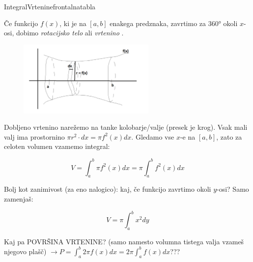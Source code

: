\begin{priprava}{}{}{Integral}{Vrtenine}{frontalna}{tabla}

Če funkcijo $ f(x) $, ki je na $ [a, b] $ enakega predznaka, zavrtimo za $ 360° $ okoli $ x $-osi, dobimo \emph{rotacijsko telo} ali \emph{vrtenino} .

\begin{figure}[h!]
    \centering
    \includegraphics[width=0.6\textwidth]{slike/volumen_vrtenine.png}
\end{figure}
    
Dobljeno vrtenino narežemo  na tanke kolobarje/valje (presek je krog). Vsak mali valj ima prostornino $ \pi r^2 \cdot dx = \pi f^2(x) dx $. Gledamo vse $ x $-e na $ [a, b] $, zato za celoten volumen vzamemo integral:

$$ V = \int_a^b \pi f^2(x) dx = \pi \int_a^b f^2(x) dx $$


Bolj kot zanimivost (za eno nalogico): kaj, če funkcijo zavrtimo okoli $ y $-osi? Samo zamenjaš:

$$ V = \pi \int_a^b x^2 dy $$

Kaj pa POVRŠINA VRTENINE? (samo namesto volumna tistega valja vzameš njegovo plašč) $ \rightarrow P = \int_a^b 2 \pi f(x) dx = 2 \pi \int_a^b f(x) dx $???
    
\end{priprava}